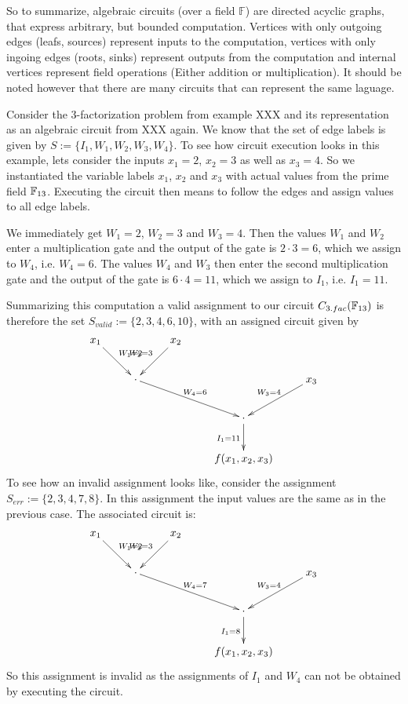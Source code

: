 So to summarize, algebraic circuits (over a field $\mathbb{F}$) are directed acyclic graphs, that express arbitrary, but bounded computation. Vertices with only outgoing edges (leafs, sources) represent inputs to the computation, vertices with only ingoing edges (roots, sinks) represent outputs from the computation and internal vertices represent field operations (Either addition or multiplication). It should be noted however that there are many circuits that can represent the same laguage.
\begin{example}[3-factorization] Consider the $3$-factorization problem from example XXX and its representation as an algebraic circuit from XXX again. We know that the set of edge labels is given by $S:=\{I_{1},W_{1},W_{2},W_{3}, W_{4}\}$. To see how circuit execution looks in this example, lets consider the inputs $x_1=2$, $x_2=3$ as well as $x_3=4$. So we instantiated the variable labels $x_1$, $x_2$ and $x_3$ with actual values from the prime field $\mathbb{F}_{13}$. Executing the circuit then means to follow the edges and assign values to all edge labels. 

We immediately get $W_1=2$, $W_2=3$ and $W_3=4$. Then the values $W_1$ and $W_2$ enter a multiplication gate and the output of the gate is $2\cdot 3 = 6$, which we assign to $W_4$, i.e. $W_4=6$. The values $W_4$ and $W_3$ then enter the second multiplication gate and the output of the gate is $6\cdot 4 = 11$, which we assign to $I_1$, i.e. $I_1=11$. 

Summarizing this computation a valid assignment to our circuit $C_{3.fac}(\mathbb{F}_{13})$ is therefore the set $S_{valid}:=\{2,3,4,6,10\}$, with an assigned circuit given by
\[
\xymatrix{x_1\ar^{W_1=2}[dr] &  & x_2\ar_{W_2=3}[dl]\\
 & \cdot \ar^{W_4=6}[drr] &   & & x_3\ar_{W_3=4}[dl]\\
  &  &  & \cdot\ar_{I_1=11}[d]\\
  &  &  & f(x_1,x_2,x_3)
}
\]
To see how an invalid assignment looks like, consider the assignment $S_{err}:=\{2,3,4,7,8\}$. In this assignment the input values are the same as in the previous case. The associated circuit is:
\[
\xymatrix{x_1\ar^{W_1=2}[dr] &  & x_2\ar_{W_2=3}[dl]\\
 & \cdot \ar^{W_4=7}[drr] &   & & x_3\ar_{W_3=4}[dl]\\
  &  &  & \cdot\ar_{I_1=8}[d]\\
  &  &  & f(x_1,x_2,x_3)
}
\]
So this assignment is invalid as the assignments of $I_1$ and $W_4$ can not be obtained by executing the circuit.
\end{example}
